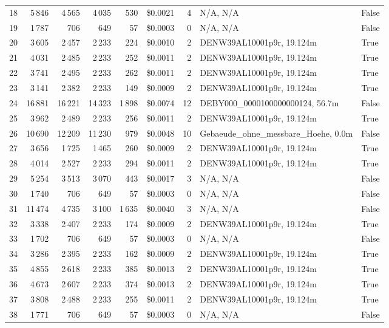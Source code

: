 \documentclass[a4paper,11pt]{article}
\begin{document}
\begin{table}[ht]
\begin{tabular}{r r r r r r r p{3cm} l}
18 & 5\,846 & 4\,565 & 4\,035 & 530 & \$0.0021 & 4 & N/A, N/A & False \\
19 & 1\,787 & 706 & 649 & 57 & \$0.0003 & 0 & N/A, N/A & False \\
20 & 3\,605 & 2\,457 & 2\,233 & 224 & \$0.0010 & 2 & DENW39AL10001p9r, 19.124m & True \\
21 & 4\,031 & 2\,485 & 2\,233 & 252 & \$0.0011 & 2 & DENW39AL10001p9r, 19.124m & True \\
22 & 3\,741 & 2\,495 & 2\,233 & 262 & \$0.0011 & 2 & DENW39AL10001p9r, 19.124m & True \\
23 & 3\,141 & 2\,382 & 2\,233 & 149 & \$0.0009 & 2 & DENW39AL10001p9r, 19.124m & True \\
24 & 16\,881 & 16\,221 & 14\,323 & 1\,898 & \$0.0074 & 12 & DEBY000\_0000100000000124, 56.7m & False \\
25 & 3\,962 & 2\,489 & 2\,233 & 256 & \$0.0011 & 2 & DENW39AL10001p9r, 19.124m & True \\
26 & 10\,690 & 12\,209 & 11\,230 & 979 & \$0.0048 & 10 & Gebaeude\_ohne\_messbare\_Hoehe, 0.0m & False \\
27 & 3\,656 & 1\,725 & 1\,465 & 260 & \$0.0009 & 2 & DENW39AL10001p9r, 19.124m & True \\
28 & 4\,014 & 2\,527 & 2\,233 & 294 & \$0.0011 & 2 & DENW39AL10001p9r, 19.124m & True \\
29 & 5\,254 & 3\,513 & 3\,070 & 443 & \$0.0017 & 3 & N/A, N/A & False \\
30 & 1\,740 & 706 & 649 & 57 & \$0.0003 & 0 & N/A, N/A & False \\
31 & 11\,474 & 4\,735 & 3\,100 & 1\,635 & \$0.0040 & 3 & N/A, N/A & False \\
32 & 3\,338 & 2\,407 & 2\,233 & 174 & \$0.0009 & 2 & DENW39AL10001p9r, 19.124m & True \\
33 & 1\,702 & 706 & 649 & 57 & \$0.0003 & 0 & N/A, N/A & False \\
34 & 3\,286 & 2\,395 & 2\,233 & 162 & \$0.0009 & 2 & DENW39AL10001p9r, 19.124m & True \\
35 & 4\,855 & 2\,618 & 2\,233 & 385 & \$0.0013 & 2 & DENW39AL10001p9r, 19.124m & True \\
36 & 4\,673 & 2\,607 & 2\,233 & 374 & \$0.0013 & 2 & DENW39AL10001p9r, 19.124m & True \\
37 & 3\,808 & 2\,488 & 2\,233 & 255 & \$0.0011 & 2 & DENW39AL10001p9r, 19.124m & True \\
38 & 1\,771 & 706 & 649 & 57 & \$0.0003 & 0 & N/A, N/A & False \\

\end{tabular}
\end{table}
\end{document}
